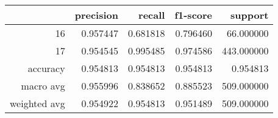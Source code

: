 \begin{tabular}{rrrrr}
\toprule
 & precision & recall & f1-score & support \\
\midrule
16 & 0.957447 & 0.681818 & 0.796460 & 66.000000 \\
17 & 0.954545 & 0.995485 & 0.974586 & 443.000000 \\
accuracy & 0.954813 & 0.954813 & 0.954813 & 0.954813 \\
macro avg & 0.955996 & 0.838652 & 0.885523 & 509.000000 \\
weighted avg & 0.954922 & 0.954813 & 0.951489 & 509.000000 \\
\bottomrule
\end{tabular}
